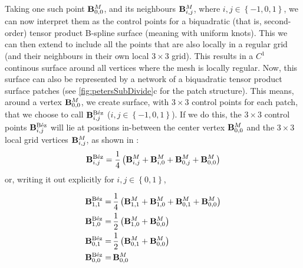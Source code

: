 Taking one such point $\petersLocalPatchPointIndices{0,0}$, and its neighbours $\petersLocalPatchPointIndices{i,j}$, where $i,j \in \left \lbrace-1,0,1\right \rbrace$, we can now interpret them as the control points for a biquadratic (that is, second-order) tensor product B-spline surface (meaning with uniform knots). This we can then extend to include all the points that are also locally in a regular grid (and their neighbours in their own local $3\times3$ grid). This results in a $C^1$ continous surface around all vertices where the mesh is locally regular.
Now, this surface can also be represented by a network of a biquadratic tensor product \Bez surface patches (see \autoref{fig:petersSubDivide}c for the patch structure). This means, around a vertex $\petersLocalPatchPointIndices{0,0}$, we create \Bez surface, with $3\times3$ control points for each patch, that we choose to call $\petersLocalBezPointIndices{i,j}$ ($i,j \in \left \lbrace-1,0,1\right \rbrace$). If we do this, the $3\times3$ \Bez control points $\petersLocalBezPointIndices{i,j}$ will lie at positions in-between the center vertex $\petersLocalPatchPointIndices{0,0}$ and the $3\times3$ local grid vertices $\petersLocalPatchPointIndices{i,j}$, as shown in \cite{peters1992constructing}:
\begin{equation}
\petersLocalBezPointIndices{i,j} = \frac{1}{4}\left(\petersLocalPatchPointIndices{i,j} + \petersLocalPatchPointIndices{i,0} + \petersLocalPatchPointIndices{0,j} + \petersLocalPatchPointIndices{0,0}\right)
\end{equation}
or, writing it out explicitly for $i,j \in \left \lbrace0,1\right \rbrace$,

\begin{align*}
\petersLocalBezPointIndices{1,1} =&\, \frac{1}{4}\left(\petersLocalPatchPointIndices{1,1} + \petersLocalPatchPointIndices{1,0} + \petersLocalPatchPointIndices{0,1} + \petersLocalPatchPointIndices{0,0}\right) \\
\petersLocalBezPointIndices{1,0} =&\, \frac{1}{2}\left(\petersLocalPatchPointIndices{1,0} + \petersLocalPatchPointIndices{0,0}\right) \\
\petersLocalBezPointIndices{0,1} =&\, \frac{1}{2}\left(\petersLocalPatchPointIndices{0,1} + \petersLocalPatchPointIndices{0,0}\right) \\
\petersLocalBezPointIndices{0,0} =&\, \petersLocalPatchPointIndices{0,0}
\end{align*}

